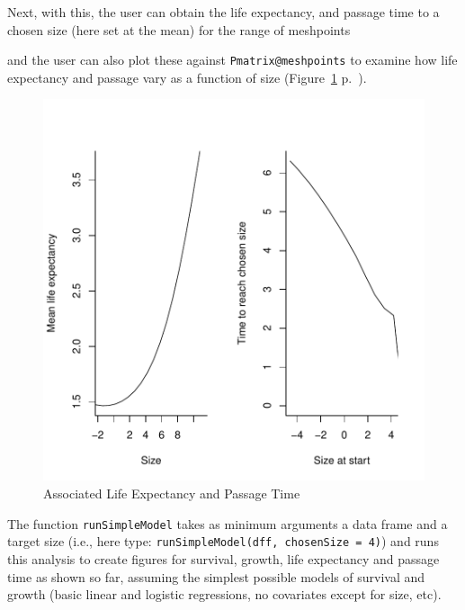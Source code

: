 \documentclass{article}
\begin{document}
Next, with this, the user can obtain the life expectancy, and passage time to a chosen size (here set at the mean) for the range of meshpoints
\begin{Schunk}
\end{Schunk}
and the user can also plot these against {\tt Pmatrix@meshpoints} to examine how
life expectancy and passage vary as a function of size (Figure~\ref{fig:three} p.~\pageref{fig:three}).
\begin{figure}
\begin{center}
\includegraphics{IPMpack_Vignette-fig3}
\end{center}
\caption{Associated Life Expectancy and Passage Time}
\label{fig:three}
\end{figure}
The function {\tt runSimpleModel} takes as minimum arguments a data frame and a
target size (i.e., here type: {\tt runSimpleModel(dff, chosenSize = 4)}) and runs this analysis to create figures for survival, growth, life expectancy and passage time as shown so far, assuming the simplest possible models of survival and growth (basic linear and logistic regressions, no covariates except for size, etc).
\end{document}
